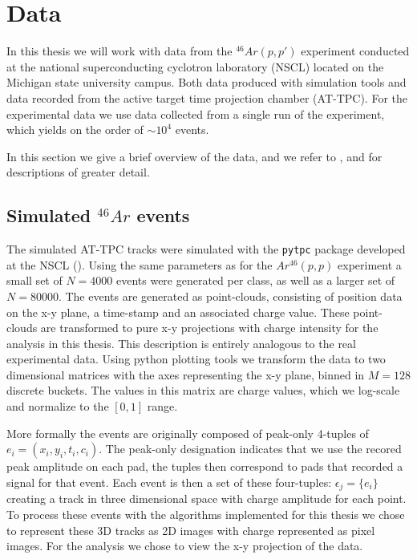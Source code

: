 \section{Data}\label{sec:data}

In this thesis we will work with data from the ${}^{46}Ar(p, p')$ experiment conducted at the national superconducting cyclotron laboratory (NSCL) located on the Michigan state university campus. Both data produced with simulation tools and data recorded from the active target time projection chamber (AT-TPC). For the experimental data we use data collected from a single run of the experiment, which yields on the order of $\sim 10^4$ events.	

In this section we give a brief overview of the data, and we refer to \cite{Mittig2015}, \cite{Suzuki2012} and  \cite{Bradt2017a}  for descriptions of greater detail.

\subsection{Simulated \texorpdfstring{${}^{46}Ar$}{46Ar}  events}\label{sec:data_sim}

The simulated AT-TPC tracks were simulated with the \lstinline{pytpc} package developed at the NSCL (\cite{Bradt2017a}). Using the same parameters as for the $Ar^{46}(p, p)$ experiment a small set of $N=4000$ events were generated per class, as well as a larger set of $N=80000$. The events are generated as point-clouds, consisting of position data on the x-y plane, a time-stamp and an associated charge value. These point-clouds are transformed to pure x-y projections with charge intensity for the analysis in this thesis. This description is entirely analogous to the real experimental data. Using python plotting tools we transform the data to two dimensional matrices with the axes representing the x-y plane, binned in $M=128$ discrete buckets. The values in this matrix are charge values, which we log-scale and normalize to the $[0, 1]$ range. 

More formally the events are originally composed of peak-only 4-tuples of $e_i = (x_i, y_i, t_i, c_i)$. The peak-only designation indicates that we use the recored peak amplitude on each pad, the tuples then correspond to pads that recorded a signal for that event. Each event is then a set of these four-tuples: $\epsilon_j = \{e_i\}$ creating a track in three dimensional space with charge amplitude for each point. To process these events with the algorithms implemented for this thesis we chose to represent these 3D tracks as 2D images with charge represented as pixel images. For the analysis we chose to view the x-y projection of the data.

